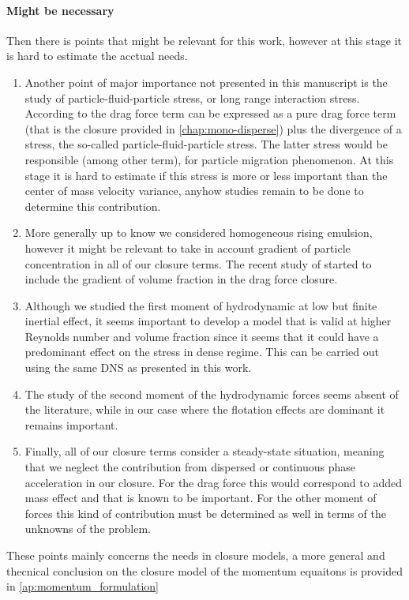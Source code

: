 \paragraph*{Might be necessary}
Then there is points that might be relevant for this work, however at this stage it is hard to estimate the acctual needs.
\begin{enumerate}
    \item Another point of major importance not presented in this manuscript is the study of particle-fluid-particle stress, or long range interaction stress. 
    According to \cite{Lhuillier_2009,nott2011suspension,zhang2021ensemble} the drag force term can be expressed as a pure drag force term (that is the closure provided in \ref{chap:mono-disperse}) plus the divergence of a stress, the so-called particle-fluid-particle stress. 
    The latter stress would be responsible (among other term), for particle migration phenomenon.  
    At this stage it is hard to estimate if this stress is more or less important than the center of mass velocity variance, anyhow studies remain to be done to determine this contribution. 
    \item More generally up to know we considered homogeneous rising emulsion, however it might be relevant to take in account gradient of particle concentration in all of our closure terms. 
    The recent study of \citet{wang2024effect} started to include the gradient of volume fraction in the drag force closure. 
    \item Although we studied the first moment of hydrodynamic at low but finite inertial effect, it seems important to develop a model that is valid at higher Reynolds number and volume fraction since it seems that it could have a predominant effect on the stress in dense regime. 
    This can be carried out using the same DNS as presented in this work. 
    \item The study of the second moment of the hydrodynamic forces seems absent of the literature, while in our case where the flotation effects are dominant it remains important. 
    \item Finally, all of our closure terms consider a steady-state situation, meaning that we neglect the contribution from dispersed or continuous phase acceleration in our closure. 
    For the drag force this would correspond to added mass effect and that is known to be important. 
    For the other moment of forces this kind of contribution must be determined as well in terms of the unknowns of the problem. 
\end{enumerate}
These points mainly concerns the needs in closure models, a more general and thecnical conclusion on the closure model of the momentum equaitons is provided in \ref{ap:momentum_formulation} 


